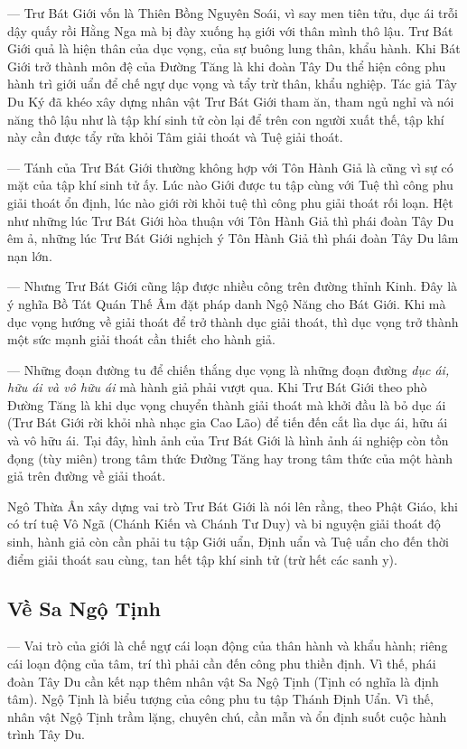 — Trư Bát Giới vốn là Thiên Bồng Nguyên Soái, vì say men tiên tửu, dục ái trỗi dậy quấy rồi Hằng Nga mà bị đày xuống hạ giới với thân mình thô lậu. Trư Bát Giới quả là hiện thân của dục vọng, của sự buông lung thân, khẩu hành. Khi Bát Giới trở thành môn đệ của Đường Tăng là khi đoàn Tây Du thể hiện công phu hành trì giới uẩn để chế ngự dục vọng và tẩy trừ thân, khẩu nghiệp. Tác giả Tây Du Ký đã khéo xây dựng nhân vật Trư Bát Giới tham ăn, tham ngủ nghỉ và nói năng thô lậu như là tập khí sinh tử còn lại để trên con người xuất thế, tập khí này cần được tẩy rửa khỏi Tâm giải thoát và Tuệ giải thoát.

— Tánh của Trư Bát Giới thường không hợp với Tôn Hành Giả là cũng vì sự có mặt của tập khí sinh tử ấy. Lúc nào Giới được tu tập cùng với Tuệ thì công phu giải thoát ổn định, lúc nào giới rời khỏi tuệ thì công phu giải thoát rối loạn. Hệt như những lúc Trư Bát Giới hòa thuận với Tôn Hành Giả thì phái đoàn Tây Du êm ả, những lúc Trư Bát Giới nghịch ý Tôn Hành Giả thì phái đoàn Tây Du lâm nạn lớn.

— Nhưng Trư Bát Giới cũng lập được nhiều công trên đường thỉnh Kinh. Đây là ý nghĩa Bồ Tát Quán Thế Âm đặt pháp danh Ngộ Năng cho Bát Giới. Khi mà dục vọng hướng về giải thoát để trở thành dục giải thoát, thì dục vọng trở thành một sức mạnh giải thoát cần thiết cho hành giả.

— Những đoạn đường tu để chiến thắng dục vọng là những đoạn đường \emph{dục ái, hữu ái và vô hữu ái} mà hành giả phải vượt qua. Khi Trư Bát Giới theo phò Đường Tăng là khi dục vọng chuyển thành giải thoát mà khởi đầu là bỏ dục ái (Trư Bát Giới rời khỏi nhà nhạc gia Cao Lão) để tiến đến cắt lìa dục ái, hữu ái và vô hữu ái. Tại đây, hình ảnh của Trư Bát Giới là hình ảnh ái nghiệp còn tồn đọng (tùy miên) trong tâm thức Đường Tăng hay trong tâm thức của một hành giả trên đường về giải thoát.

Ngô Thừa Ân xây dựng vai trò Trư Bát Giới là nói lên rằng, theo Phật Giáo, khi có trí tuệ Vô Ngã (Chánh Kiến và Chánh Tư Duy) và bi nguyện giải thoát độ sinh, hành giả còn cần phải tu tập Giới uẩn, Định uẩn và Tuệ uẩn cho đến thời điểm giải thoát sau cùng, tan hết tập khí sinh tử (trừ hết các sanh y).

\subsection{Về Sa Ngộ Tịnh} %
\label{sub:ve_sa_ngo_tinh}

— Vai trò của giới là chế ngự cái loạn động của thân hành và khẩu hành; riêng cái loạn động của tâm, trí thì phải cần đến công phu thiền định. Vì thế, phái đoàn Tây Du cần kết nạp thêm nhân vật Sa Ngộ Tịnh (Tịnh có nghĩa là định tâm). Ngộ Tịnh là biểu tượng của công phu tu tập Thánh Định Uẩn. Vì thế, nhân vật Ngộ Tịnh trầm lặng, chuyên chú, cần mẫn và ổn định suốt cuộc hành trình Tây Du.

